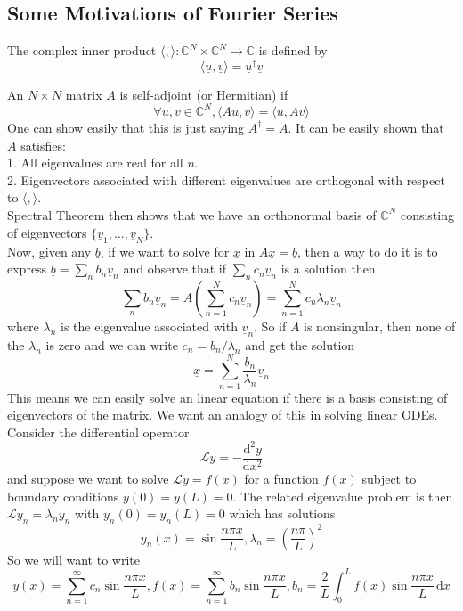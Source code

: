 \subsection{Some Motivations of Fourier Series}
\begin{definition}
    The complex inner product $\langle,\rangle:\mathbb C^N\times\mathbb C^N\to\mathbb C$ is defined by
    $$\langle\underline{u},\underline{v}\rangle=\underline{u}^\dagger\underline{v}$$
\end{definition}
An $N\times N$  matrix $A$ is self-adjoint (or Hermitian) if
$$\forall\underline{u},\underline{v}\in\mathbb C^N,\langle A\underline{u},\underline{v}\rangle=\langle\underline{u},A\underline{v}\rangle$$
One can show easily that this is just saying $A^\dagger=A$.
It can be easily shown that $A$ satisfies:\\
1. All eigenvalues are real for all $n$.\\
2. Eigenvectors associated with different eigenvalues are orthogonal with respect to $\langle,\rangle$.\\
Spectral Theorem then shows that we have an orthonormal basis of $\mathbb C^N$ consisting of eigenvectors $\{\underline{v}_1,\ldots,\underline{v}_N\}$.\\
Now, given any $\underline{b}$, if we want to solve for $\underline{x}$ in $A\underline{x}=\underline{b}$, then a way to do it is to express $\underline{b}=\sum_nb_n\underline{v}_n$ and observe that if $\sum_nc_n\underline{v}_n$ is a solution then
$$\sum_nb_n\underline{v}_n=A\left(\sum_{n=1}^Nc_n\underline{v}_n\right)=\sum_{n=1}^Nc_n\lambda_n\underline{v}_n$$
where $\lambda_n$ is the eigenvalue associated with $\underline{v}_n$.
So if $A$ is nonsingular, then none of the $\lambda_n$ is zero and we can write $c_n=b_n/\lambda_n$ and get the solution
$$\underline{x}=\sum_{n=1}^N\frac{b_n}{\lambda_n}\underline{v}_n$$
This means we can easily solve an linear equation if there is a basis consisting of eigenvectors of the matrix.
We want an analogy of this in solving linear ODEs.
Consider the differential operator
$$\mathcal Ly=-\frac{\mathrm d^2y}{\mathrm dx^2}$$
and suppose we want to solve $\mathcal Ly=f(x)$ for a function $f(x)$ subject to boundary conditions $y(0)=y(L)=0$.
The related eigenvalue problem is then $\mathcal L y_n=\lambda_ny_n$ with $y_n(0)=y_n(L)=0$ which has solutions
$$y_n(x)=\sin\frac{n\pi x}{L},\lambda_n=\left( \frac{n\pi}{L} \right)^2$$
So we will want to write
$$y(x)=\sum_{n=1}^\infty c_n\sin\frac{n\pi x}{L},f(x)=\sum_{n=1}^\infty b_n\sin\frac{n\pi x}{L},b_n=\frac{2}{L}\int_0^Lf(x)\sin\frac{n\pi x}{L}\,\mathrm dx$$

